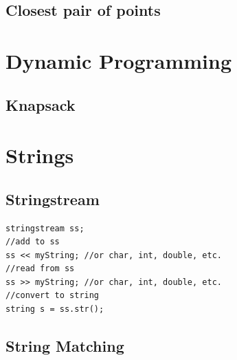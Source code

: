 \documentclass[10pt,a4paper,titlepage]{article}
\begin{document}



\subsection{Closest pair of points}




\fi

\section{Dynamic Programming}
\subsection{Knapsack}



\section{Strings}
\subsection{Stringstream}
\begin{lstlisting}
stringstream ss;
//add to ss
ss << myString; //or char, int, double, etc.
//read from ss
ss >> myString; //or char, int, double, etc.
//convert to string
string s = ss.str();
\end{lstlisting}
\subsection{String Matching}
\end{document}
